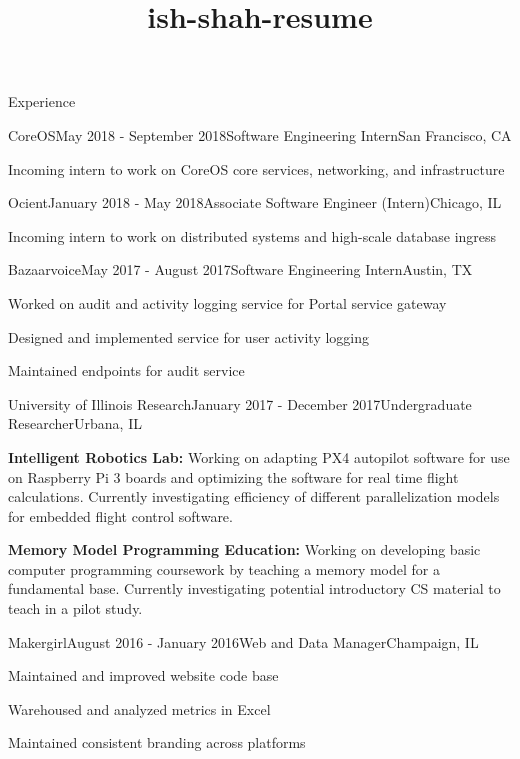 \documentclass{resume} %
\title{ish-shah-resume}
\begin{document}
    
    \begin{rSection}{Experience}
    
    \begin{rSubsection}{CoreOS}{May 2018 - September 2018}{Software Engineering Intern}{San Francisco, CA}
    \item Incoming intern to work on CoreOS core services, networking, and infrastructure
    \end{rSubsection}
    
    \begin{rSubsection}{Ocient}{January 2018 - May 2018}{Associate Software Engineer (Intern)}{Chicago, IL}
    \item Incoming intern to work on distributed systems and high-scale database ingress
    \end{rSubsection}
    
    \begin{rSubsection}{Bazaarvoice}{May 2017 - August 2017}{Software Engineering Intern}{Austin, TX}
    \item Worked on audit and activity logging service for Portal service gateway
    \item Designed and implemented service for user activity logging
    \item Maintained endpoints for audit service
    \end{rSubsection}
    
    \begin{rSubsection}{University of Illinois Research}{January 2017 - December 2017}{Undergraduate Researcher}{Urbana, IL}
    \item \textbf{Intelligent Robotics Lab:} Working on adapting PX4 autopilot software for use on Raspberry Pi 3 boards and optimizing the software for real time flight calculations. Currently investigating efficiency of different parallelization models for embedded flight control software.
    \item \textbf{Memory Model Programming Education:} Working on developing basic computer programming coursework by teaching a memory model for a fundamental base. Currently investigating potential introductory CS material to teach in a pilot study.
    \end{rSubsection}
    
    \begin{rSubsection}{Makergirl}{August 2016 - January 2016}{Web and Data Manager}{Champaign, IL}
    \item Maintained and improved website code base
    \item Warehoused and analyzed metrics in Excel
    \item Maintained consistent branding across platforms
    \end{rSubsection}
    
    \end{rSection}
    
\end{document}
